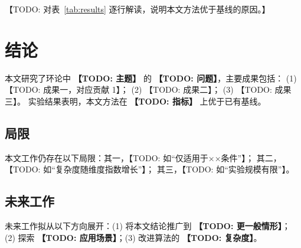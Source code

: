 \documentclass[11pt]{ctexart}
\theoremstyle{plain}
\theoremstyle{definition}
\theoremstyle{remark}
\begin{document}
【TODO: 对表~\ref{tab:results} 逐行解读，说明本文方法优于基线的原因。】

\section{结论}
\label{sec:conclusion}
本文研究了环论中 \textbf{【TODO: 主题】} 的 \textbf{【TODO: 问题】}，主要成果包括：
(1) 【TODO: 成果一，对应贡献 1】；
(2) 【TODO: 成果二】；
(3) 【TODO: 成果三】。
实验结果表明，本文方法在 \textbf{【TODO: 指标】} 上优于已有基线。

\subsection{局限}
\label{sec:limitation}
本文工作仍存在以下局限：其一，【TODO: 如“仅适用于××条件”】；
其二，【TODO: 如“复杂度随维度指数增长”】；
其三，【TODO: 如“实验规模有限”】。

\subsection{未来工作}
\label{sec:future}
未来工作拟从以下方向展开：(1) 将本文结论推广到 \textbf{【TODO: 更一般情形】}；
(2) 探索 \textbf{【TODO: 应用场景】}；(3) 改进算法的 \textbf{【TODO: 复杂度】}。




\end{document}
